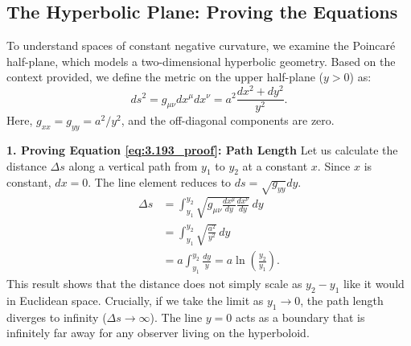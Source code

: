 \documentclass[11pt, a4paper]{report}
\begin{document}
\subsection*{The Hyperbolic Plane: Proving the Equations}
To understand spaces of constant negative curvature, we examine the Poincaré half-plane, which models a two-dimensional hyperbolic geometry. Based on the context provided, we define the metric on the upper half-plane ($y > 0$) as:
\begin{equation}
ds^2 = g_{\mu\nu} dx^\mu dx^\nu = a^2 \frac{dx^2 + dy^2}{y^2}. \label{eq:hyperbolic_metric}
\end{equation}
Here, $g_{xx} = g_{yy} = a^2/y^2$, and the off-diagonal components are zero.

\textbf{1. Proving Equation \eqref{eq:3.193_proof}: Path Length}
Let us calculate the distance $\Delta s$ along a vertical path from $y_1$ to $y_2$ at a constant $x$. Since $x$ is constant, $dx = 0$. The line element reduces to $ds = \sqrt{g_{yy}} dy$. 
\begin{align}
\Delta s &= \int_{y_1}^{y_2} \sqrt{g_{\mu\nu} \frac{dx^\mu}{dy} \frac{dx^\nu}{dy}} \, dy \nonumber \\
         &= \int_{y_1}^{y_2} \sqrt{\frac{a^2}{y^2}} \, dy \nonumber \\
         &= a \int_{y_1}^{y_2} \frac{dy}{y} = a \ln\left(\frac{y_2}{y_1}\right). \label{eq:3.193_proof}
\end{align}
This result shows that the distance does not simply scale as $y_2 - y_1$ like it would in Euclidean space. Crucially, if we take the limit as $y_1 \to 0$, the path length diverges to infinity ($\Delta s \to \infty$). The line $y=0$ acts as a boundary that is infinitely far away for any observer living on the hyperboloid.
\end{document}
